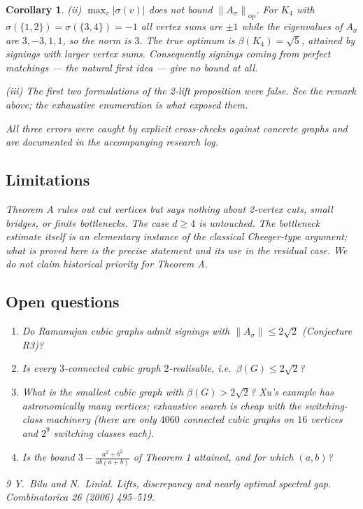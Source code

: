 \documentclass[11pt,a4paper]{article}
\theoremstyle{plain}
\newtheorem{corollary}[theorem]{Corollary}
\theoremstyle{definition}
\newcommand{\sgn}{\sigma}
\newcommand{\norm}[1]{\left\lVert #1\right\rVert}
\begin{document}
\begin{corollary}
\emph{(ii) $\max_v|\sgn(v)|$ does not bound $\norm{A_{\sgn}}_{\mathrm{op}}$.}
For $K_4$ with $\sgn(\{1,2\})=\sgn(\{3,4\})=-1$ all vertex sums are $\pm1$
while the eigenvalues of $A_{\sgn}$ are $3,-3,1,1$, so the norm is $3$. The
true optimum is $\beta(K_4)=\sqrt5$, attained by signings with larger vertex
sums. Consequently signings coming from perfect matchings --- the natural first
idea --- give no bound at all.

\emph{(iii) The first two formulations of the 2-lift proposition were false.}
See the remark above; the exhaustive enumeration is what exposed them.

All three errors were caught by explicit cross-checks against concrete graphs
and are documented in the accompanying research log.

\subsection*{Limitations}

Theorem A rules out cut vertices but says nothing about 2-vertex cuts, small
bridges, or finite bottlenecks. The case $d\ge4$ is untouched. The bottleneck
estimate itself is an elementary instance of the classical Cheeger-type
argument; what is proved here is the precise statement and its use in the
residual case. We do not claim historical priority for Theorem A.

\subsection*{Open questions}

\begin{enumerate}[leftmargin=2em]
\item Do Ramanujan cubic graphs admit signings with
$\norm{A_{\sgn}}\le2\sqrt2$ (Conjecture R3)?
\item Is every $3$-connected cubic graph $2$-realisable, i.e.\ $\beta(G)\le2\sqrt2$?
\item What is the smallest cubic graph with $\beta(G)>2\sqrt2$? Xu's example has
astronomically many vertices; exhaustive search is cheap with the switching-class
machinery (there are only $4060$ connected cubic graphs on $16$ vertices and
$2^9$ switching classes each).
\item Is the bound $3-\frac{a^2+b^2}{ab(a+b)}$ of Theorem 1 attained, and for
which $(a,b)$?
\end{enumerate}

\begin{thebibliography}{9}
 Y.~Bilu and N.~Linial. Lifts, discrepancy and nearly optimal
spectral gap. \emph{Combinatorica} 26 (2006) 495--519.


\end{thebibliography}
\end{corollary}
\end{document}

